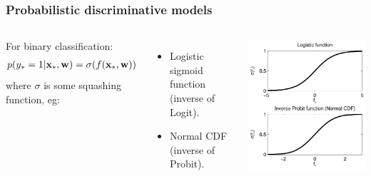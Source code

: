 \begin{frame}
\frametitle{Probabilistic discriminative models}
\begin{columns}[c]
For binary classification:
\begin{align*}
p(y_*=1|{\bf x}_*,{\bf w}) = \sigma(f({\bf x}_*,{\bf w}))
\end{align*}
where $\sigma$ is some squashing function, eg:
\begin{itemize}
\item Logistic sigmoid function (inverse of Logit).
\item Normal CDF (inverse of Probit).
\end{itemize}
\includegraphics[width=.75\textwidth]{squashing}
\end{columns}
\end{frame}

